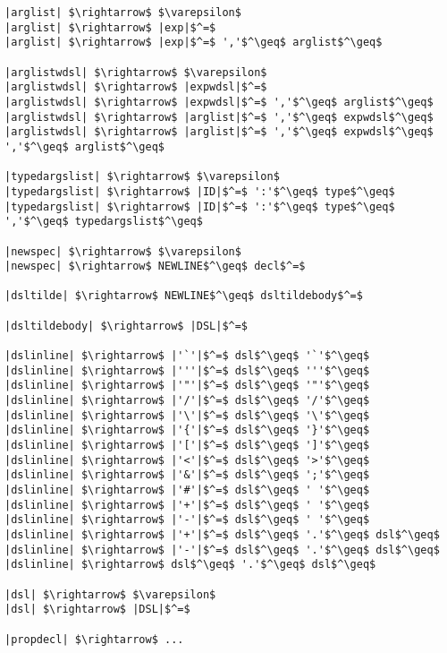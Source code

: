 \begin{lstlisting}[mathescape]
|arglist| $\rightarrow$ $\varepsilon$
|arglist| $\rightarrow$ |exp|$^=$
|arglist| $\rightarrow$ |exp|$^=$ ','$^\geq$ arglist$^\geq$

|arglistwdsl| $\rightarrow$ $\varepsilon$
|arglistwdsl| $\rightarrow$ |expwdsl|$^=$
|arglistwdsl| $\rightarrow$ |expwdsl|$^=$ ','$^\geq$ arglist$^\geq$
|arglistwdsl| $\rightarrow$ |arglist|$^=$ ','$^\geq$ expwdsl$^\geq$
|arglistwdsl| $\rightarrow$ |arglist|$^=$ ','$^\geq$ expwdsl$^\geq$ ','$^\geq$ arglist$^\geq$

|typedargslist| $\rightarrow$ $\varepsilon$
|typedargslist| $\rightarrow$ |ID|$^=$ ':'$^\geq$ type$^\geq$
|typedargslist| $\rightarrow$ |ID|$^=$ ':'$^\geq$ type$^\geq$ ','$^\geq$ typedargslist$^\geq$

|newspec| $\rightarrow$ $\varepsilon$
|newspec| $\rightarrow$ NEWLINE$^\geq$ decl$^=$

|dsltilde| $\rightarrow$ NEWLINE$^\geq$ dsltildebody$^=$

|dsltildebody| $\rightarrow$ |DSL|$^=$

|dslinline| $\rightarrow$ |'`'|$^=$ dsl$^\geq$ '`'$^\geq$
|dslinline| $\rightarrow$ |'''|$^=$ dsl$^\geq$ '''$^\geq$
|dslinline| $\rightarrow$ |'"'|$^=$ dsl$^\geq$ '"'$^\geq$
|dslinline| $\rightarrow$ |'/'|$^=$ dsl$^\geq$ '/'$^\geq$
|dslinline| $\rightarrow$ |'\'|$^=$ dsl$^\geq$ '\'$^\geq$
|dslinline| $\rightarrow$ |'{'|$^=$ dsl$^\geq$ '}'$^\geq$
|dslinline| $\rightarrow$ |'['|$^=$ dsl$^\geq$ ']'$^\geq$
|dslinline| $\rightarrow$ |'<'|$^=$ dsl$^\geq$ '>'$^\geq$
|dslinline| $\rightarrow$ |'&'|$^=$ dsl$^\geq$ ';'$^\geq$
|dslinline| $\rightarrow$ |'#'|$^=$ dsl$^\geq$ ' '$^\geq$
|dslinline| $\rightarrow$ |'+'|$^=$ dsl$^\geq$ ' '$^\geq$
|dslinline| $\rightarrow$ |'-'|$^=$ dsl$^\geq$ ' '$^\geq$
|dslinline| $\rightarrow$ |'+'|$^=$ dsl$^\geq$ '.'$^\geq$ dsl$^\geq$
|dslinline| $\rightarrow$ |'-'|$^=$ dsl$^\geq$ '.'$^\geq$ dsl$^\geq$
|dslinline| $\rightarrow$ dsl$^\geq$ '.'$^\geq$ dsl$^\geq$

|dsl| $\rightarrow$ $\varepsilon$
|dsl| $\rightarrow$ |DSL|$^=$

|propdecl| $\rightarrow$ ...
\end{lstlisting}